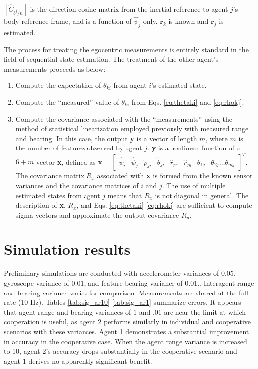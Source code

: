 \documentclass{aiaa-tc}
\newcommand{\B}[1]{\textbf{#1}} %
\begin{document}
$[\hat{C}_{b^j/n}]$ is the direction cosine matrix from the inertial reference to agent $j$'s body reference frame, and is a function of $\hat{\psi}_j$ only. $\B{r}_k$ is known and $\B{r}_j$ is estimated.

The process for treating the egocentric measurements is entirely standard in the field of sequential state estimation. The treatment of the other agent's measurements proceeds as below:

\begin{enumerate}
\item Compute the expectation of $\theta_{ki}$ from agent $i$'s estimated state.
\item Compute the ``measured'' value of $\theta_{ki}$ from Eqs. \ref{eq:thetaki} and \ref{eq:rhokj}.
\item Compute the covariance associated with the ``measurements'' using the method of statistical linearization employed previously with measured range and bearing. In this case, the output \B{y} is a vector of length $m$, where $m$ is the number of features observed by agent $j$. \B{y} is a nonlinear function of a $6+m$ vector \B{x}, defined as $\B{x} = \begin{bmatrix}
\hat{\psi}_i & \hat{\psi}_j & \tilde{\rho}_{ji} & \tilde{\theta}_{ji} & \hat{r}_{jx} & \hat{r}_{jy} & \theta_{1j} & \theta_{2j} \dots \theta_{mj}
\end{bmatrix}^T$. The covariance matrix $R_x$ associated with \B{x} is formed from the known sensor variances and the covariance matrices of $i$ and $j$. The use of multiple estimated states from agent $j$ means that $R_x$ is not diagonal in general. The description of \B{x}, $R_x$, and Eqs. \ref{eq:thetaki}-\ref{eq:rhokj} are sufficient to compute sigma vectors and approximate the output covariance $R_y$.
\end{enumerate}

\section{Simulation results}

Preliminary simulations are conducted with accelerometer variances of $0.05$, gyroscope variance of $0.01$, and feature bearing variance of $0.01$.. Interagent range and bearing variance varies for comparison. Measurements are shared at the full rate (10 Hz). Tables \ref{tab:sig_ar10}-\ref{tab:sig_ar1} summarize errors. It appears that agent range and bearing variances of $1$ and $.01$ are near the limit at which cooperation is useful, as agent 2 performs similarly in individual and cooperative scenarios with these variances. Agent 1 demonstrates a substantial improvement in accuracy in the cooperative case. When the agent range variance is increased to 10, agent 2's accuracy drops substantially in the cooperative scenario and agent 1 derives no apparently significant benefit. 
\end{document}
